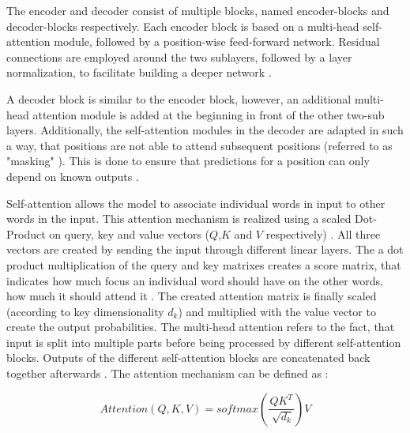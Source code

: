 The encoder and decoder consist of multiple blocks, named encoder-blocks and decoder-blocks respectively.
Each encoder block is based on a multi-head self-attention module, followed by a position-wise feed-forward network.
Residual connections are employed around the two sublayers, followed by a layer normalization, to facilitate building a deeper network \cite{vaswani2017AttentionAllYou, lin2022SurveyTransformers}.

A decoder block is similar to the encoder block, however, an additional multi-head attention module is added at the beginning in front of the other two-sub layers.
Additionally, the self-attention modules in the decoder are adapted in such a way, that positions are not able to attend subsequent positions (referred to as "masking" \cite[p. 3]{vaswani2017AttentionAllYou}).
This is done to ensure that predictions for a position can only depend on known outputs \cite{vaswani2017AttentionAllYou, lin2022SurveyTransformers}.

Self-attention allows the model to associate individual words in input to other words in the input.
This attention mechanism is realized using a scaled Dot-Product on query, key and value vectors ($Q$,$K$ and $V$ respectively) \cite{vaswani2017AttentionAllYou}.
All three vectors are created by sending the input through different linear layers.
The a dot product multiplication of the query and key matrixes creates a score matrix, that indicates how much focus an individual word should have on the other words, \ie how much it should attend it \cite{vaswani2017AttentionAllYou}.
The created attention matrix is finally scaled (according to key dimensionality $d_k$) and multiplied with the value vector to create the output probabilities.
The multi-head attention refers to the fact, that input is split into multiple parts before being processed by different self-attention blocks.
Outputs of the different self-attention blocks are concatenated back together afterwards \cite{vaswani2017AttentionAllYou}.
The attention mechanism can be defined as \cite[p.4]{vaswani2017AttentionAllYou}:

\begin{equation}
  \label{eqn:attention}
  Attention(Q,K,V)=softmax(\frac{QK^T}{\sqrt[]{d_k}})V
\end{equation}


